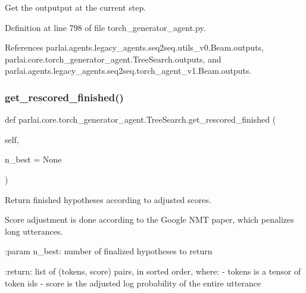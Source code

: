 \begin{DoxyVerb}Get the outputput at the current step.\end{DoxyVerb}
 

Definition at line 798 of file torch\+\_\+generator\+\_\+agent.\+py.



References parlai.\+agents.\+legacy\+\_\+agents.\+seq2seq.\+utils\+\_\+v0.\+Beam.\+outputs, parlai.\+core.\+torch\+\_\+generator\+\_\+agent.\+Tree\+Search.\+outputs, and parlai.\+agents.\+legacy\+\_\+agents.\+seq2seq.\+torch\+\_\+agent\+\_\+v1.\+Beam.\+outputs.

\mbox{\label{classparlai_1_1core_1_1torch__generator__agent_1_1TreeSearch_a4b70f85eec7d81b3a0e1afaea5b09332}} 
\subsubsection{\texorpdfstring{get\+\_\+rescored\+\_\+finished()}{get\_rescored\_finished()}}
{\footnotesize\ttfamily def parlai.\+core.\+torch\+\_\+generator\+\_\+agent.\+Tree\+Search.\+get\+\_\+rescored\+\_\+finished (\begin{DoxyParamCaption}\item[{}]{self,  }\item[{}]{n\+\_\+best = {\ttfamily None} }\end{DoxyParamCaption})}

\begin{DoxyVerb}Return finished hypotheses according to adjusted scores.

Score adjustment is done according to the Google NMT paper, which
penalizes long utterances.

:param n_best:
    number of finalized hypotheses to return

:return:
    list of (tokens, score) pairs, in sorted order, where:
      - tokens is a tensor of token ids
      - score is the adjusted log probability of the entire utterance
\end{DoxyVerb}
 

